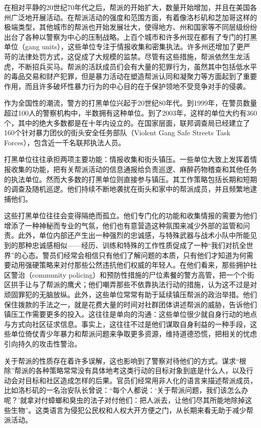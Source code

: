 \documentclass[fontset=fandol, a4paper, 12pt, openright]{ctexbook}
\begin{document}
在相对平静的20世纪70年代之后，帮派的开始扩大，数量开始增加，并且在美国各州广泛地开展活动。在帮派活动的强度和范围方面，有着像洛杉矶和芝加哥这样的极端类型，其他城市的帮派也开始发展壮大，使得地方、州和国家等不同层级纷纷出台了各种以警察为中心的压制战略。上百个城市和许多州现在都有了专门的打黑单位（gang units），这些单位专注于情报收集和密集执法。许多州还增加了更严苛的法律处罚方式，这促成了大规模的监禁。尽管有这些措施，帮派依然生龙活虎，不断招兵买马。帮派的活跃成员们会有大量的犯罪行为，虽然其中包括低水平的毒品交易和财产犯罪，但是暴力活动在塑造帮派认同和凝聚力等方面起到了重要作用，而且许多破坏性暴力行为的中心目的在于保护领地不受竞争对手的侵袭。

作为全国性的潮流，警方的打黑单位兴起于20世纪80年代。到1999年，在警员数量超过100人的警察机构中，半数拥有这种单位。到了2003年，这样的单位大约有360个，其中的绝大多数都是在十年内设立的。在国家层面，联邦调查局已经建立了160个针对暴力团伙的街头安全任务部队（Violent Gang Safe Streets Task Forces），包含近一千名联邦执法人员。

打黑单位往往承担两项主要功能：情报收集和街头镇压。一些单位大致上发挥着情报收集的功能，把有关帮派活动的信息通报给负责巡逻、麻醉药物稽查和其他任务的执法单位。然而大多数的打黑单位则直接参与镇压。其工作策略包括长期和短期的调查及随机巡逻。他们持续不断地袭扰在街头和家中的帮派成员，并且频繁地逮捕他们。

这些打黑单位往往会变得隔绝而孤立。他们专门化的功能和收集情报的需要为他们增添了一种神秘而专业的气氛，他们也有意营造这种氛围来减少外部的监管和问责。此外，单位内部还产生出一种强烈的忠诚感，与特殊武器与战术小队中所能见到的那种忠诚感相似——经历、训练和特殊的工作性质促成了一种“我们对抗全世界”的心态。警员们经常会相信只有他们了解问题的本质，只有他们才知道为何需要动用强硬策略来对付那些公然违抗他们权威的年轻人。在他们看来，那些拥护社区警治（community policing）和预防性措施的尸位素餐的警方高管，把一个个街区拱手让与了帮派的鹰犬；他们嘲弄那些不依靠执法行动的措施，认为这不过是对顽固罪犯的无脑放纵。此外，这些单位常常有助于延续镇压帮派的政治举措。他们保住拨款的手法之一，就是花费大量的时间对社群团体讲述帮派的威胁，告诉他们镇压工作需要更多的投入。这往往是单向的沟通：这些单位很少就自身行动的地点与方式向社区征求信息。事实上，这往往不过是他们谋取自身利益的一种手段，这些单位倚仗青少年暴力和帮派问题来争取更多资源，维持道德恐慌，把相关的忧虑引向持久的攻击性警治。

关于帮派的性质存在着许多误解，这也影响到了警察对待他们的方式。谋求“根除”帮派的各种策略常常没有具体地考这类行动的目标对象到底是什么人，以及行动会对目标和社区造成怎样的后果。官员们经常用非人化的语言来描述帮派成员，比如洛杉矶的一名治安队长曾说：“每个人都说：‘关于帮派问题，我们该怎么办呢？’就拿对付蟑螂和臭虫的法子对付他们：把人派去，让他们尽其所能地除掉这些生物”。这类语言为侵犯公民权和人权大开方便之门，从长期来看无助于减少帮派活动。
\end{document}
